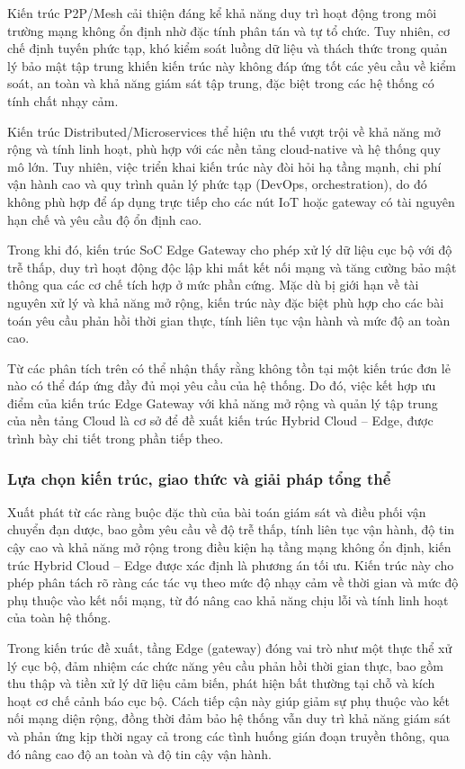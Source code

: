 Kiến trúc P2P/Mesh cải thiện đáng kể khả năng duy trì hoạt động trong môi trường
mạng không ổn định nhờ đặc tính phân tán và tự tổ chức. Tuy nhiên, cơ chế định
tuyến phức tạp, khó kiểm soát luồng dữ liệu và thách thức trong quản lý bảo mật
tập trung khiến kiến trúc này không đáp ứng tốt các yêu cầu về kiểm soát, an toàn
và khả năng giám sát tập trung, đặc biệt trong các hệ thống có tính chất nhạy cảm.

Kiến trúc Distributed/Microservices thể hiện ưu thế vượt trội về khả năng mở rộng
và tính linh hoạt, phù hợp với các nền tảng cloud-native và hệ thống quy mô lớn.
Tuy nhiên, việc triển khai kiến trúc này đòi hỏi hạ tầng mạnh, chi phí vận hành cao
và quy trình quản lý phức tạp (DevOps, orchestration), do đó không phù hợp để áp
dụng trực tiếp cho các nút IoT hoặc gateway có tài nguyên hạn chế và yêu cầu độ
ổn định cao.

Trong khi đó, kiến trúc SoC Edge Gateway cho phép xử lý dữ liệu cục bộ với độ trễ
thấp, duy trì hoạt động độc lập khi mất kết nối mạng và tăng cường bảo mật thông
qua các cơ chế tích hợp ở mức phần cứng. Mặc dù bị giới hạn về tài nguyên xử lý và
khả năng mở rộng, kiến trúc này đặc biệt phù hợp cho các bài toán yêu cầu phản hồi
thời gian thực, tính liên tục vận hành và mức độ an toàn cao.

Từ các phân tích trên có thể nhận thấy rằng không tồn tại một kiến trúc đơn lẻ nào
có thể đáp ứng đầy đủ mọi yêu cầu của hệ thống. Do đó, việc kết hợp ưu điểm của
kiến trúc Edge Gateway với khả năng mở rộng và quản lý tập trung của nền tảng Cloud
là cơ sở để đề xuất kiến trúc Hybrid Cloud – Edge, được trình bày chi tiết trong
phần tiếp theo.
\subsubsection{Lựa chọn kiến trúc, giao thức và giải pháp tổng thể}

Xuất phát từ các ràng buộc đặc thù của bài toán giám sát và điều phối vận chuyển
đạn dược, bao gồm yêu cầu về độ trễ thấp, tính liên tục vận hành, độ tin cậy cao
và khả năng mở rộng trong điều kiện hạ tầng mạng không ổn định, kiến trúc
Hybrid Cloud – Edge được xác định là phương án tối ưu. Kiến trúc này cho phép
phân tách rõ ràng các tác vụ theo mức độ nhạy cảm về thời gian và mức độ phụ
thuộc vào kết nối mạng, từ đó nâng cao khả năng chịu lỗi và tính linh hoạt của
toàn hệ thống.

Trong kiến trúc đề xuất, tầng Edge (gateway) đóng vai trò như một thực thể xử lý
cục bộ, đảm nhiệm các chức năng yêu cầu phản hồi thời gian thực, bao gồm thu thập
và tiền xử lý dữ liệu cảm biến, phát hiện bất thường tại chỗ và kích hoạt cơ chế
cảnh báo cục bộ. Cách tiếp cận này giúp giảm sự phụ thuộc vào kết nối mạng diện
rộng, đồng thời đảm bảo hệ thống vẫn duy trì khả năng giám sát và phản ứng kịp
thời ngay cả trong các tình huống gián đoạn truyền thông, qua đó nâng cao độ an
toàn và độ tin cậy vận hành.

